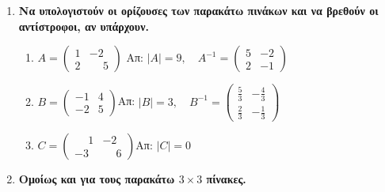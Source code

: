 \documentclass[a4paper,12pt]{article}
\begin{document}
\thispagestyle{empty}

\begin{center}
\end{center}

\vspace{\baselineskip}


\begin{enumerate}

\item {\bfseries Να υπολογιστούν οι ορίζουσες των παρακάτω πινάκων και να βρεθούν οι αντίστροφοι, αν υπάρχουν.}

\renewcommand{\theenumii}{\roman{enumii}}
\begin{enumerate}
\item 
\(
A=\begin{pmatrix}
1 & -2 \\ 
2 & \phantom{-}5
\end{pmatrix}
\) \hfill Απ: $|A|=9,\quad A^{-1}= \begin{pmatrix}
5 & -2 \\ 
2 & -1
\end{pmatrix}$
\item  
\(
B=
\begin{pmatrix}
-1 & 4 \\ 
-2 & 5
\end{pmatrix}
\)\hfill Απ: $|B|=3,\quad B^{-1}= \begin{pmatrix}
\frac{5}{3} & -\frac{4}{3} \\[2pt] 
\frac{2}{3} & -\frac{1}{3}
\end{pmatrix}$
\item 
\(
C=
\begin{pmatrix}
\phantom{-}1 & -2 \\ 
-3 & \phantom{-}6
\end{pmatrix}
\)\hfill Απ: $|C|=0$
\end{enumerate}



\item {\bfseries Ομοίως και για τους παρακάτω $3\times 3$ πίνακες.}

\begin{enumerate}


\end{enumerate}
\end{enumerate}
\end{document}
